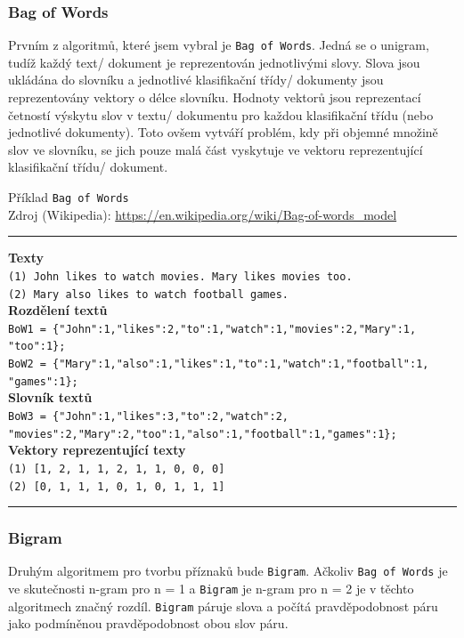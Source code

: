 \documentclass[12pt]{article}
\begin{document}
\subsubsection{Bag of Words}
Prvním z algoritmů, které jsem vybral je \texttt{Bag of Words}. Jedná
se o unigram, tudíž každý text/ dokument je reprezentován jednotlivými
slovy. Slova jsou ukládána do slovníku a jednotlivé klasifikační třídy/
dokumenty
jsou reprezentovány vektory o délce slovníku. Hodnoty vektorů jsou
reprezentací četností výskytu slov v textu/ dokumentu pro každou
klasifikační třídu (nebo jednotlivé dokumenty). Toto ovšem 
vytváří problém, kdy při objemné množině slov ve slovníku, se jich pouze
malá část vyskytuje ve vektoru reprezentující klasifikační třídu/
dokument.

Příklad \texttt{Bag of Words}\\
Zdroj (Wikipedia): \url{https://en.wikipedia.org/wiki/Bag-of-words\_model} \\
\rule{\textwidth}{0.4pt}
	\textbf{Texty}\\
	\texttt{(1) John likes to watch movies. Mary likes movies too.}\\
	\texttt{(2) Mary also likes to watch football games.}\\

	\textbf{Rozdělení textů}\\
	\texttt{BoW1 = \{"John":1,"likes":2,"to":1,"watch":1,"movies":2,"Mary":1,\\"too":1\};}\\
	\texttt{BoW2 = \{"Mary":1,"also":1,"likes":1,"to":1,"watch":1,"football":1,\\"games":1\};}\\

	\textbf{Slovník textů}\\
	\texttt{BoW3 = \{"John":1,"likes":3,"to":2,"watch":2,\\"movies":2,"Mary":2,"too":1,"also":1,"football":1,"games":1\};}\\

	\textbf{Vektory reprezentující texty}\\
	\texttt{(1) [1, 2, 1, 1, 2, 1, 1, 0, 0, 0]}\\
	\texttt{(2) [0, 1, 1, 1, 0, 1, 0, 1, 1, 1]}\\
\rule{\textwidth}{0.4pt}
\subsubsection{Bigram}
Druhým algoritmem pro tvorbu příznaků bude \texttt{Bigram}. Ačkoliv 
\texttt{Bag of Words} je ve skutečnosti n-gram pro n = 1 a \texttt{Bigram}
je n-gram pro n = 2 je v těchto algoritmech značný rozdíl. \texttt{Bigram}
páruje slova a počítá pravděpodobnost páru jako podmíněnou pravděpodobnost
obou slov páru.
\end{document}
